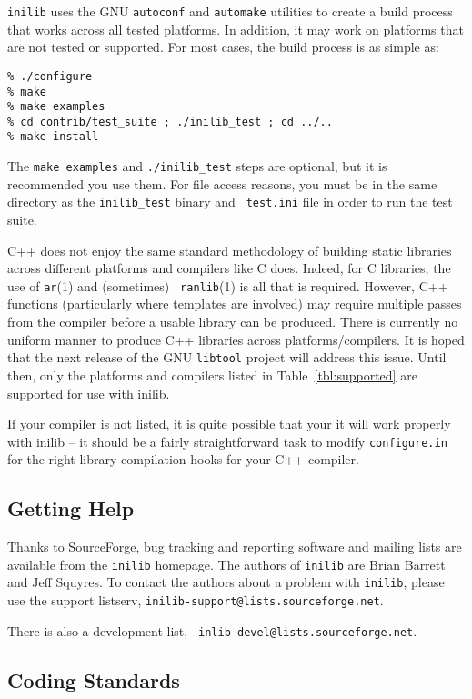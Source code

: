 {\tt inilib} uses the GNU {\tt autoconf} and {\tt automake} utilities
to create a build process that works across all tested platforms.  In
addition, it may work on platforms that are not tested or supported.
For most cases, the build process is as simple as:

\begin{verbatim}
% ./configure
% make
% make examples
% cd contrib/test_suite ; ./inilib_test ; cd ../..
% make install
\end{verbatim}

The {\tt make examples} and {\tt ./inilib\_test} steps are optional,
but it is recommended you use them.  For file access reasons, you must
be in the same directory as the {\tt inilib\_test} binary and {\tt
test.ini} file in order to run the test suite.

C++ does not enjoy the same standard methodology of building static
libraries across different platforms and compilers like C does.
Indeed, for C libraries, the use of {\tt ar}(1) and (sometimes) {\tt
  ranlib}(1) is all that is required.  However, C++ functions
(particularly where templates are involved) may require multiple
passes from the compiler before a usable library can be produced.
There is currently no uniform manner to produce C++ libraries across
platforms/compilers.   It is hoped that the next release of the GNU
{\tt libtool} project will address this issue.  Until then, only the
platforms and compilers listed in Table~\ref{tbl:supported} are
supported for use with inilib.  

If your compiler is not listed, it is quite possible that your it will
work properly with inilib -- it should be a fairly straightforward
task to modify {\tt configure.in} for the right library compilation
hooks for your C++ compiler.

\subsection{Getting Help}

Thanks to SourceForge, bug tracking and reporting software and mailing
lists are available from the {\tt inilib} homepage.  The authors of
{\tt inilib} are Brian Barrett and Jeff Squyres.  To contact the
authors about a problem with {\tt inilib}, please use the support
listserv, {\tt inilib-support@lists.sourceforge.net}.  

There is also a development list, {\tt
inlib-devel@lists.sourceforge.net}.

 
\subsection{Coding Standards}
\label{sec:codestd}

